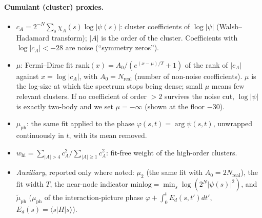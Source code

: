 \documentclass[11pt,a4paper]{article}
\begin{document}
\paragraph{Cumulant (cluster) proxies.}
\begin{itemize}
  \item $c_A=2^{-N}\sum_s\chi_A(s)\log|\psi(s)|$: cluster coefficients of $\log|\psi|$ (Walsh--Hadamard
    transform); $|A|$ is the order of the cluster. Coefficients with $\log|c_A|<-28$ are noise (``symmetry zeros'').
  \item $\mu$: Fermi--Dirac fit $\mathrm{rank}(x)=A_0/(e^{(x-\mu)/T}+1)$ of the rank of $|c_A|$ against
    $x=\log|c_A|$, with $A_0=N_{\mathrm{real}}$ (number of non-noise coefficients). $\mu$ is the log-size at which the
    spectrum stops being dense; small $\mu$ means few relevant clusters. If no coefficient of order $>2$ survives the
    noise cut, $\log|\psi|$ is exactly two-body and we set $\mu=-\infty$ (shown at the floor $-30$).
  \item $\mu_{\mathrm{ph}}$: the same fit applied to the phase $\varphi(s,t)=\arg\psi(s,t)$, unwrapped continuously in
    $t$, with its mean removed.
  \item $w_{\mathrm{hi}}=\sum_{|A|>4}c_A^2/\sum_{|A|\ge1}c_A^2$: fit-free weight of the high-order clusters.
  \item \emph{Auxiliary}, reported only where noted: $\mu_2$ (the same fit with $A_0=2N_{\mathrm{real}}$), the fit
    width $T$, the near-node indicator $\mathrm{minlog}=\min_s\log(2^N|\psi(s)|^2)$, and $\tilde\mu_{\mathrm{ph}}$
    ($\mu_{\mathrm{ph}}$ of the interaction-picture phase $\varphi+\int_0^tE_d(s,t')dt'$, $E_d(s)=\langle s|H|s\rangle$).
\end{itemize}
\end{document}
